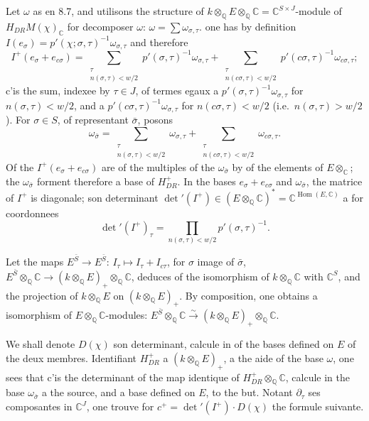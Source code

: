 \documentclass[12pt,a4paper]{article}
\theoremstyle{plain}
\theoremstyle{definition}
\theoremstyle{remark}
\DeclareMathOperator{\Hom}{Hom}
\newcommand{\Q}{\mathbb{Q}}
\newcommand{\C}{\mathbb{C}}
\begin{document}
Let $\omega$ as en 8.7, and utilisons the structure of
$k \otimes_\Q E \otimes_\Q \C = \C^{S \times J}$-module of $H_{DR} M(\chi)_\C$ for decomposer
$\omega$: $\omega = \sum \omega_{\sigma,\tau}$. one has by definition $I(e_\sigma) =
p'(\chi; \sigma, \tau)^{-1} \omega_{\sigma,\tau}$ and therefore
\[
I^+(e_\sigma + e_{c\sigma}) = \sum_{\substack{\tau \\ n(\sigma,\tau) < w/2}} p'(\sigma, \tau)^{-1} \omega_{\sigma,\tau}
+ \sum_{\substack{\tau \\ n(c\sigma,\tau) < w/2}} p'(c\sigma, \tau)^{-1} \omega_{c\sigma,\tau};
\]
c'is the sum, indexee by $\tau \in J$, of termes egaux a $p'(\sigma, \tau)^{-1} \omega_{\sigma,\tau}$
for $n(\sigma, \tau) < w/2$, and a $p'(c\sigma, \tau)^{-1} \omega_{\sigma,\tau}$ for
$n(c\sigma, \tau) < w/2$ (i.e.~$n(\sigma, \tau) > w/2$). For $\sigma \in S$, of representant
$\bar{\sigma}$, posons
\[
\omega_{\bar{\sigma}} = \sum_{\substack{\tau \\ n(\sigma,\tau) < w/2}} \omega_{\sigma,\tau}
+ \sum_{\substack{\tau \\ n(c\sigma,\tau) < w/2}} \omega_{c\sigma,\tau}.
\]
Of the $I^+(e_\sigma + e_{c\sigma})$ are of the multiples of the $\omega_{\bar{\sigma}}$ by of the elements of
$E \otimes_\C$; the $\omega_{\bar{\sigma}}$ forment therefore a base of $H_{DR}^+$. In the bases
$e_\sigma + e_{c\sigma}$ and $\omega_{\bar{\sigma}}$, the matrice of $I^+$ is diagonale; son determinant
$\det'(I^+) \in (E \otimes_\Q \C)^* = \C^{\Hom(E,\C)}$ a for coordonnees
\[
\det'(I^+)_\tau = \prod_{n(\sigma,\tau) < w/2} p'(\sigma, \tau)^{-1}.
\]

Let the maps $E^{\bar{S}} \to E^{\bar{S}}$: $I_\tau \mapsto I_\tau + I_{c\tau}$, for $\sigma$ image of
$\bar{\sigma}$, $E^{\bar{S}} \otimes_\Q \C \to (k \otimes_\Q E)_+ \otimes_\Q \C$, deduces of the isomorphism of
$k \otimes_\Q \C$ with $\C^S$, and the projection of $k \otimes_\Q E$ on $(k \otimes_\Q E)_+$. By
composition, one obtains a isomorphism of $E \otimes_\Q \C$-modules:
$E^{\bar{S}} \otimes_\Q \C \xrightarrow{\sim} (k \otimes_\Q E)_+ \otimes_\Q \C$.

We shall denote $D(\chi)$ son determinant, calcule in of the bases defined on $E$ of the
deux membres. Identifiant $H_{DR}^+$ a $(k \otimes_\Q E)_+$, a the aide of the base $\omega$,
one sees that c'is the determinant of the map identique of $H_{DR}^+ \otimes_\Q \C$, calcule
in the base $\omega_{\bar{\sigma}}$ a the source, and a base defined on $E$, to the but. Notant
$\partial_\tau$ ses composantes in $\C^J$, one trouve for $c^+ = \det'(I^+) \cdot D(\chi)$ the
formule suivante.
\end{document}
